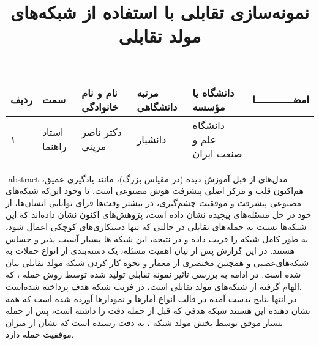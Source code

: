 



\subject{مهندسی کامپیوتر}


\title{نمونه‌سازی تقابلی با استفاده از شبکه‌های مولد تقابلی}







\firstPage
\besmPage
\davaranPage

\vspace{.5cm}

\begin{center}
	\begin{tabular}{| p{8mm} | p{18mm} | p{} |p{14mm}|p{}|c|}
		\hline
		ردیف	& سمت & نام و نام خانوادگی & مرتبه \newline دانشگاهی &	دانشگاه یا مؤسسه &	امضـــــــــــــا\\
		\hline
		۱  &	استاد راهنما & دکتر \newline  ناصر مزینی & دانشیار & دانشگاه \newline علم و صنعت ایران &  \\
		\hline
	\end{tabular}
\end{center}



\fa-abstract{
مدل‌های از قبل آموزش دیده (در مقیاس بزرگ)، مانند یادگیری عمیق، هم‌اکنون قلب و مرکز اصلی پیشرفت هوش مصنوعی است. با وجود این‌که شبکه‌های مصنوعی پیشرفت و موفقیت چشم‌گیری، در بیشتر وقت‌ها فرای توانایی انسان‌ها، از خود در حل مسئله‌های پیچیده نشان داده است، پژوهش‌های اکنون نشان داده‌اند که این شبکه‌ها نسبت به حمله‌های تقابلی در حالتی که تنها دستکاری‌های کوچکی اعمال شود، به طور کامل شبکه را فریب داده و در نتیجه، این شبکه ها بسیار آسیب پذیر و حساس هستند. 
در این گزارش پس از بیان اهمیت مسئله، یک دسته‌بندی از انواع حملات به شبکه‌های‌عصبی و همچنین مختصری از معمار و نحوه کار کردن شبکه مولد تقابلی بیان شده است. در ادامه به بررسی تاثیر نمونه‌ تقابلی تولید شده توسط روش حمله 
، که الهام گرفته از شبکه‌های مولد تقابلی است، در فریب شبکه هدف پرداخته شده‌است. 
\\
در انتها نتایج بدست آمده در قالب انواع آمارها و نمودارها آورده شده است که همه نشان دهنده این هستند شبکه هدفی که قبل از حمله دقت 
را داشته است، پس از حمله بسیار موفق توسط بخش مولد شبکه 
، به دقت 
رسیده است که نشان از میزان موفقیت 
حمله
 دارد.
}

\abstractPage

\newpage\clearpage

